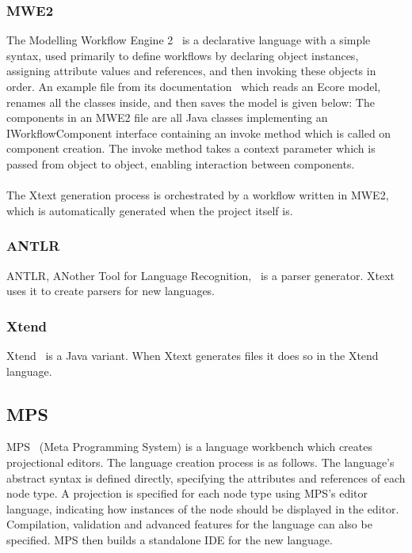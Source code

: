 \documentclass{article}
\begin{document}
\subsubsection{MWE2}
The Modelling Workflow Engine 2~\cite{mwe2} is a declarative language with a simple syntax, used primarily to define workflows by declaring object instances, assigning attribute values and references, and then invoking these objects in order. An example file from its documentation~\cite{mwe2} which reads an Ecore model, renames all the classes inside, and then saves the model is given below: 
The components in an MWE2 file are all Java classes implementing an IWorkflowComponent interface containing an invoke method which is called on component creation. The invoke method takes a context parameter which is passed from object to object, enabling interaction between components.
\\
\\
The Xtext generation process is orchestrated by a workflow written in MWE2, which is automatically generated when the project itself is.
\subsubsection{ANTLR}
ANTLR, ANother Tool for Language Recognition,~\cite{antlr} is a parser generator. Xtext uses it to create parsers for new languages.
\subsubsection{Xtend}
Xtend~\cite{xtend} is a Java variant. When Xtext generates files it does so in the Xtend language.
\subsection{MPS}\label{mps}
MPS~\cite{mps} (Meta Programming System) is a language workbench which creates projectional editors. The language creation process is as follows. The language's abstract syntax is defined directly, specifying the attributes and references of each node type. A projection is specified for each node type using MPS's editor language, indicating how instances of the node should be displayed in the editor. Compilation, validation and advanced features for the language can also be specified. MPS then builds a standalone IDE for the new language. 
\end{document}
